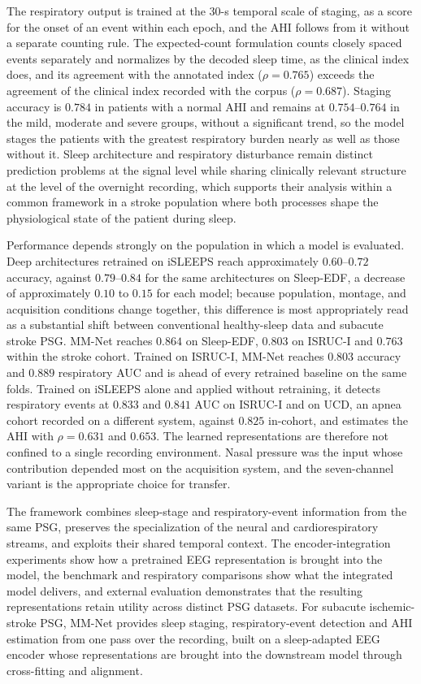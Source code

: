 \documentclass[a4paper,fleqn]{cas-sc}
\newcommand{\mmAcc}{0.763}
\newcommand{\mmAuc}{0.825}
\newcommand{\mmRho}{0.765}
\begin{document}
The respiratory output is trained at the 30-s temporal scale of staging, as a score for the onset
of an event within each epoch, and the AHI follows from it without a separate counting rule. The
expected-count formulation counts closely spaced events separately and normalizes by the decoded
sleep time, as the clinical index does, and its agreement with the annotated index
($\rho=\mmRho$) exceeds the agreement of the clinical index recorded with the corpus
($\rho=0.687$). Staging accuracy is $0.784$ in patients with a normal AHI and remains at
$0.754$--$0.764$ in the mild, moderate and severe groups, without a significant trend, so the model
stages the patients with the greatest respiratory burden nearly as well as those without it. Sleep
architecture and respiratory disturbance remain distinct prediction problems at the signal level
while sharing clinically relevant structure at the level of the overnight recording, which
supports their analysis within a common framework in a stroke population where both processes
shape the physiological state of the patient during sleep.

Performance depends strongly on the population in which a model is evaluated. Deep architectures
retrained on iSLEEPS reach approximately $0.60$--$0.72$ accuracy, against $0.79$--$0.84$ for the
same architectures on Sleep-EDF, a decrease of approximately $0.10$ to $0.15$ for each model;
because population, montage, and acquisition conditions change together, this difference is most
appropriately read as a substantial shift between conventional healthy-sleep data and subacute
stroke PSG. MM-Net reaches $0.864$ on Sleep-EDF, $0.803$ on ISRUC-I and
$\mmAcc$ within the stroke cohort. Trained on ISRUC-I, MM-Net reaches $0.803$ accuracy and $0.889$
respiratory AUC and is ahead of every retrained baseline on the same folds. Trained on iSLEEPS alone
and applied without retraining, it detects respiratory events at $0.833$ and $0.841$ AUC on ISRUC-I
and on UCD, an apnea cohort recorded on a different system, against $\mmAuc$ in-cohort, and
estimates the AHI with $\rho=0.631$ and $0.653$. The learned representations are therefore not
confined to a single recording environment. Nasal pressure was the input whose contribution
depended most on the acquisition system, and the seven-channel variant is the appropriate choice
for transfer.

The framework combines sleep-stage and respiratory-event information from the same PSG, preserves
the specialization of the neural and cardiorespiratory streams, and exploits their shared temporal
context. The encoder-integration experiments show how a pretrained EEG representation is brought
into the model, the benchmark and respiratory comparisons show what the integrated model delivers,
and external evaluation demonstrates that the resulting representations retain utility across
distinct PSG datasets. For subacute ischemic-stroke PSG, MM-Net provides sleep staging,
respiratory-event detection and AHI estimation from one pass over the recording, built on a
sleep-adapted EEG encoder whose representations are brought into the downstream model through
cross-fitting and alignment.
\end{document}
